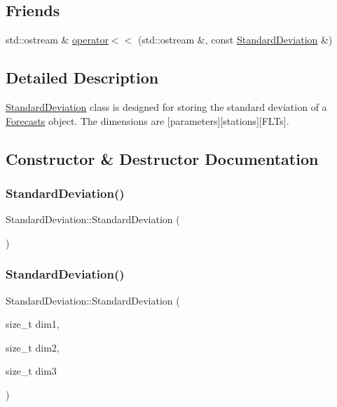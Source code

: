 \subsection*{Friends}
\begin{DoxyCompactItemize}
\item 
std\+::ostream \& \mbox{\hyperlink{class_standard_deviation_a983ad4d351fca4bad35c367110ba27e2}{operator$<$$<$}} (std\+::ostream \&, const \mbox{\hyperlink{class_standard_deviation}{Standard\+Deviation}} \&)
\end{DoxyCompactItemize}


\subsection{Detailed Description}
\mbox{\hyperlink{class_standard_deviation}{Standard\+Deviation}} class is designed for storing the standard deviation of a \mbox{\hyperlink{class_forecasts}{Forecasts}} object. The dimensions are \mbox{[}parameters\mbox{]}\mbox{[}stations\mbox{]}\mbox{[}F\+L\+Ts\mbox{]}. 

\subsection{Constructor \& Destructor Documentation}
\mbox{\label{class_standard_deviation_a526f8eb4fc84a43285d0ab3a8b03a601}} 
\subsubsection{\texorpdfstring{Standard\+Deviation()}{StandardDeviation()}\hspace{0.1cm}{\footnotesize\ttfamily [1/3]}}
{\footnotesize\ttfamily Standard\+Deviation\+::\+Standard\+Deviation (\begin{DoxyParamCaption}{ }\end{DoxyParamCaption})}

\mbox{\label{class_standard_deviation_a06f6311463d5386e8c6808582b383541}} 
\subsubsection{\texorpdfstring{Standard\+Deviation()}{StandardDeviation()}\hspace{0.1cm}{\footnotesize\ttfamily [2/3]}}
{\footnotesize\ttfamily Standard\+Deviation\+::\+Standard\+Deviation (\begin{DoxyParamCaption}\item[{size\+\_\+t}]{dim1,  }\item[{size\+\_\+t}]{dim2,  }\item[{size\+\_\+t}]{dim3 }\end{DoxyParamCaption})}

